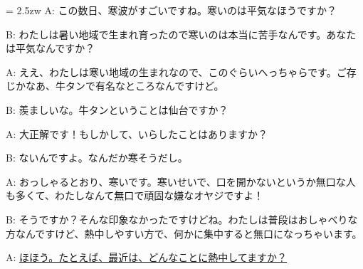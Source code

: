 \documentclass[11pt]{amsart}
\title{}
\author{}
\newenvironment{hangall}[1]{\hangindent = 2.5zw\everypar{\hangindent = 2.5zw}}{}
\begin{document}
\maketitle
\begin{hangall}{}%
A: この数日、寒波がすごいですね。寒いのは平気なほうですか？

B: わたしは暑い地域で生まれ育ったので寒いのは本当に苦手なんです。あなたは平気なんですか？

A: ええ、わたしは寒い地域の生まれなので、このぐらいへっちゃらです。ご存じかなあ、牛タンで有名なところなんですけど。

B: 羨ましいな。牛タンということは仙台ですか？

A: 大正解です！もしかして、いらしたことはありますか？

B: ないんですよ。なんだか寒そうだし。

A: おっしゃるとおり、寒いです。寒いせいで、口を開かないというか無口な人も多くて、わたしなんて無口で頑固な嫌なオヤジですよ！

B: そうですか？そんな印象なかったですけどね。わたしは普段はおしゃべりな方なんですけど、熱中しやすい方で、何かに集中すると無口になっちゃいます。

A: \ul{ほほう。たとえば、最近は、どんなことに熱中してますか？}\end{hangall}
\end{document}
